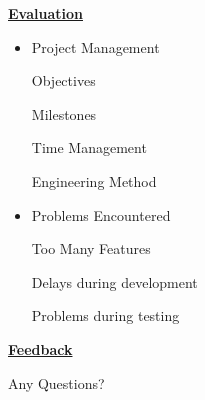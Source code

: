 \documentclass[a4,12pt]{seminar}
\newcommand{\SlideTitle}[1]{\Large \underline{\textbf{#1}}\normalsize}
\begin{document}
\begin{slide}{\SlideTitle{Evaluation}}

\begin{itemize}

\item Project Management

\subitem Objectives

\subitem Milestones

\subitem Time Management

\subitem Engineering Method

\item Problems Encountered

\subitem Too Many Features

\subitem Delays during development

\subitem Problems during testing

\end{itemize}

\vfill

\end{slide}


\begin{slide}{\SlideTitle{Feedback}}

\vspace{25mm}

\begin{center}
Any Questions?
\end{center}

\vfill

\end{slide}
\end{document}
